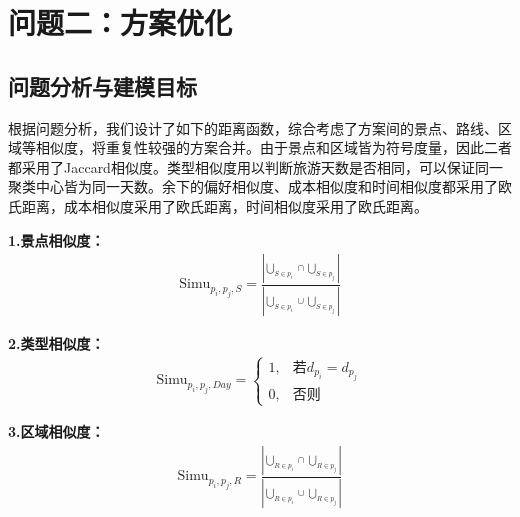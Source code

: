 \section[\hspace{-2pt}问题二：方案优化]{{\heiti{} \hspace{-8pt}问题二：方案优化}}\label{section3: 问题2：方案优化}

\subsection[\hspace{-2pt}问题分析与建模目标]{{\heiti{} \hspace{-8pt}问题分析与建模目标}}\label{section2: 问题分析与建模目标}

根据问题分析，我们设计了如下的距离函数，综合考虑了方案间的景点、路线、区域等相似度，将重复性较强的方案合并。由于景点和区域皆为符号度量，因此二者都采用了Jaccard相似度。类型相似度用以判断旅游天数是否相同，可以保证同一聚类中心皆为同一天数。余下的偏好相似度、成本相似度和时间相似度都采用了欧氏距离，成本相似度采用了欧氏距离，时间相似度采用了欧氏距离。

\noindent\textbf{1.景点相似度：}
\begin{equation}
  \begin{aligned}
    \text{Simu}_{p_{i},p_{j},S} = \frac{|\underset{S\in p_i}{\bigcup}\cap \underset{S\in p_j}{\bigcup}|}{|\underset{S\in p_i}{\bigcup}\cup \underset{S\in p_j}{\bigcup}|}
  \end{aligned}
\end{equation}

\noindent\textbf{2.类型相似度：}
\begin{equation}
  \begin{aligned}
    \text{Simu}_{p_{i},p_{j},Day} = \begin{cases}
      1, & \text{若}d_{p_i}=d_{p_j}\\
      0, & \text{否则}
    \end{cases}
  \end{aligned}
\end{equation}

\noindent\textbf{3.区域相似度：}
\begin{equation}
  \begin{aligned}
    \text{Simu}_{p_{i},p_{j},R} = \frac{|\underset{R\in p_i}{\bigcup}\cap \underset{R\in p_j}{\bigcup}|}{|\underset{R\in p_i}{\bigcup}\cup \underset{R\in p_j}{\bigcup}|}
  \end{aligned}
\end{equation}

